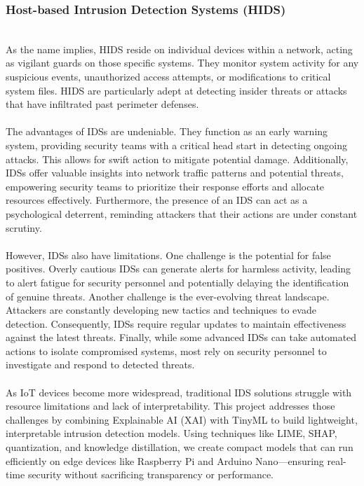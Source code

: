 \documentclass[conference,letterpaper]{IEEEtran}
\begin{document}
\subsubsection{Host-based Intrusion Detection Systems (HIDS)}\\ As the name implies, HIDS reside on individual devices within a network, acting as vigilant guards on those specific systems.  They monitor system activity for any suspicious events, unauthorized access attempts, or modifications to critical system files.  HIDS are particularly adept at detecting insider threats or attacks that have infiltrated past perimeter defenses.
~\\
~\\
The advantages of IDSs are undeniable. They function as an early warning system, providing security teams with a critical head start in detecting ongoing attacks. This allows for swift action to mitigate potential damage. Additionally, IDSs offer valuable insights into network traffic patterns and potential threats, empowering security teams to prioritize their response efforts and allocate resources effectively. Furthermore, the presence of an IDS can act as a psychological deterrent, reminding attackers that their actions are under constant scrutiny.
~\\
~\\
However, IDSs also have limitations.  One challenge is the potential for false positives.  Overly cautious IDSs can generate alerts for harmless activity, leading to alert fatigue for security personnel and potentially delaying the identification of genuine threats.  Another challenge is the ever-evolving threat landscape.  Attackers are constantly developing new tactics and techniques to evade detection.  Consequently, IDSs require regular updates to maintain effectiveness against the latest threats.  Finally, while some advanced IDSs can take automated actions to isolate compromised systems, most rely on security personnel to investigate and respond to detected threats.
~\\
~\\
As IoT devices become more widespread, traditional IDS solutions struggle with resource limitations and lack of interpretability. This project addresses those challenges by combining Explainable AI (XAI) with TinyML to build lightweight, interpretable intrusion detection models. Using techniques like LIME, SHAP, quantization, and knowledge distillation, we create compact models that can run efficiently on edge devices like Raspberry Pi and Arduino Nano—ensuring real-time security without sacrificing transparency or performance.
\end{document}

